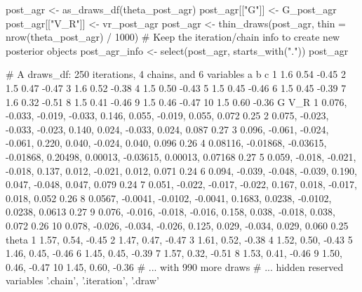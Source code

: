 \documentclass[a4paper,12pt,twoside]{article}
\begin{document}
\begin{Rinput}
post_agr <- as_draws_df(theta_post_agr)
post_agr[["G"]] <- G_post_agr
post_agr[["V_R"]] <- vr_post_agr
post_agr <- thin_draws(post_agr, thin = nrow(theta_post_agr) / 1000)
# Keep the iteration/chain info to create new posterior objects
post_agr_info <- select(post_agr, starts_with("."))
post_agr
\end{Rinput}
\begin{Routput}
# A draws_df: 250 iterations, 4 chains, and 6 variables
     a    b     c
1  1.6 0.54 -0.45
2  1.5 0.47 -0.47
3  1.6 0.52 -0.38
4  1.5 0.50 -0.43
5  1.5 0.45 -0.46
6  1.5 0.45 -0.39
7  1.6 0.32 -0.51
8  1.5 0.41 -0.46
9  1.5 0.46 -0.47
10 1.5 0.60 -0.36
                                                                                     G  V_R
1                    0.076, -0.033, -0.019, -0.033, 0.146, 0.055, -0.019, 0.055, 0.072 0.25
2                    0.075, -0.023, -0.033, -0.023, 0.140, 0.024, -0.033, 0.024, 0.087 0.27
3                    0.096, -0.061, -0.024, -0.061, 0.220, 0.040, -0.024, 0.040, 0.096 0.26
4  0.08116, -0.01868, -0.03615, -0.01868, 0.20498, 0.00013, -0.03615, 0.00013, 0.07168 0.27
5                    0.059, -0.018, -0.021, -0.018, 0.137, 0.012, -0.021, 0.012, 0.071 0.24
6                    0.094, -0.039, -0.048, -0.039, 0.190, 0.047, -0.048, 0.047, 0.079 0.24
7                    0.051, -0.022, -0.017, -0.022, 0.167, 0.018, -0.017, 0.018, 0.052 0.26
8           0.0567, -0.0041, -0.0102, -0.0041, 0.1683, 0.0238, -0.0102, 0.0238, 0.0613 0.27
9                    0.076, -0.016, -0.018, -0.016, 0.158, 0.038, -0.018, 0.038, 0.072 0.26
10                   0.078, -0.026, -0.034, -0.026, 0.125, 0.029, -0.034, 0.029, 0.060 0.25
               theta
1  1.57, 0.54, -0.45
2  1.47, 0.47, -0.47
3  1.61, 0.52, -0.38
4  1.52, 0.50, -0.43
5  1.46, 0.45, -0.46
6  1.45, 0.45, -0.39
7  1.57, 0.32, -0.51
8  1.53, 0.41, -0.46
9  1.50, 0.46, -0.47
10 1.45, 0.60, -0.36
# ... with 990 more draws
# ... hidden reserved variables {'.chain', '.iteration', '.draw'}
\end{Routput}
\end{document}

